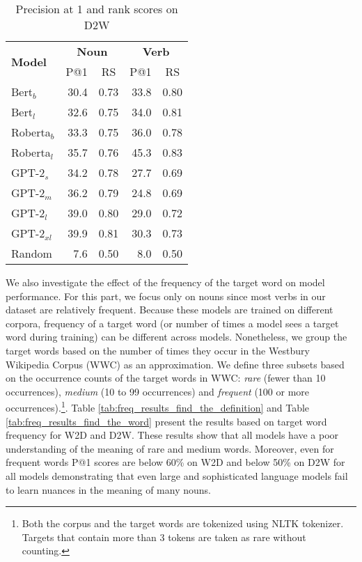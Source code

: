 \documentclass[11pt,a4paper]{article}
\begin{document}
\begin{table}
    \centering
    \begin{tabular}{l|rrrr}
        \hline
         \multirow{2}{*}{\textbf{Model}} & \multicolumn{2}{c}{\textbf{Noun}} & \multicolumn{2}{c}{\textbf{Verb}} \\
         & \multicolumn{1}{c}{P@1} & \multicolumn{1}{c}{RS} & \multicolumn{1}{c}{P@1} & \multicolumn{1}{c}{RS} \\ \hline
     Bert$_{b}$ & 30.4 & 0.73 & 33.8 & 0.80 \\
     Bert$_{l}$ & 32.6 & 0.75 & 34.0 & 0.81 \\
     Roberta$_{b}$ & 33.3 & 0.75 & 36.0 & 0.78 \\
     Roberta$_{l}$ & 35.7 & 0.76 & 45.3 & 0.83 \\ \hline
     GPT-2$_{s}$ & 34.2 & 0.78 & 27.7 & 0.69 \\
     GPT-2$_{m}$ & 36.2 & 0.79 & 24.8 & 0.69 \\
     GPT-2$_{l}$ & 39.0 & 0.80 & 29.0 & 0.72 \\
     GPT-2$_{xl}$ & 39.9 & 0.81 & 30.3 & 0.73 \\ \hline 
     Random & 7.6 & 0.50 & 8.0 & 0.50 \\\hline
     
    \end{tabular}
    \caption{Precision at 1 and rank scores on D2W}
    \label{tab:results_find_the_word}
\end{table}


We also investigate the effect of the frequency of the
target word on model performance. For this part, we
focus only on  nouns since most  verbs in our dataset
are relatively frequent. Because these models are trained on
different corpora, frequency of a target word (or number of
times a model sees a target word during training) can be
different across  models. Nonetheless, we group the
target words based on the number of times they occur in the
Westbury Wikipedia Corpus (WWC) \cite{WWC} as an
approximation. We
define three subsets based on the occurrence counts of the
target words in WWC: \textit{rare} (fewer than 10 occurrences),
 \textit{medium} (10 to 99 occurrences) and
 \textit{frequent}
(100 or more occurrences).\footnote{Both the corpus and
  the target words are tokenized using NLTK tokenizer.  Targets
  that contain more than 3 tokens are taken as rare without
  counting.}. Table
\ref{tab:freq_results_find_the_definition} and Table
\ref{tab:freq_results_find_the_word} present the  results
based on target word frequency for
W2D and D2W.
These results show that
all models have a poor understanding of the meaning of 
rare and medium words. Moreover, even for 
frequent words P@1 scores are below 60\% on W2D and below 50\% on D2W for all models demonstrating that even  large and sophisticated language
models fail to learn nuances in the meaning of many
nouns.
\end{document}
